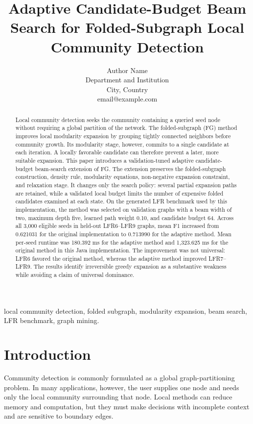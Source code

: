 \documentclass[10pt,journal,compsoc]{IEEEtran}
\title{Adaptive Candidate-Budget Beam Search for Folded-Subgraph Local Community Detection}
\author{Author Name\\
Department and Institution\\
City, Country\\
email@example.com}
\begin{document}
\maketitle

\begin{abstract}
Local community detection seeks the community containing a queried seed node
without requiring a global partition of the network. The folded-subgraph (FG)
method improves local modularity expansion by grouping tightly connected
neighbors before community growth. Its modularity stage, however, commits to a
single candidate at each iteration. A locally favorable candidate can
therefore prevent a later, more suitable expansion. This paper introduces a
validation-tuned adaptive candidate-budget beam-search extension of FG. The
extension preserves the folded-subgraph construction, density rule,
modularity equations, non-negative expansion constraint, and relaxation stage.
It changes only the search policy: several partial expansion paths are retained,
while a validated local budget limits the number of expensive folded candidates
examined at each state. On the generated LFR benchmark used by this
implementation, the method was selected on validation graphs with a beam
width of two, maximum depth five, learned path weight 0.10, and candidate
budget 64. Across all 3,000 eligible seeds in held-out LFR6--LFR9 graphs,
mean F1 increased from 0.621031 for the original implementation to 0.713990
for the adaptive method. Mean per-seed runtime was 180.392 ms for the adaptive
method and 1,323.625 ms for the original method in this Java implementation.
The improvement was not universal: LFR6 favored the original method, whereas
the adaptive method improved LFR7--LFR9. The results identify irreversible
greedy expansion as a substantive weakness while avoiding a claim of universal
dominance.
\end{abstract}

\begin{IEEEkeywords}
local community detection, folded subgraph, modularity expansion, beam
search, LFR benchmark, graph mining.
\end{IEEEkeywords}

\section{Introduction}
Community detection is commonly formulated as a global graph-partitioning
problem. In many applications, however, the user supplies one node and needs
only the local community surrounding that node. Local methods can reduce
memory and computation, but they must make decisions with incomplete context
and are sensitive to boundary edges.
\end{document}
